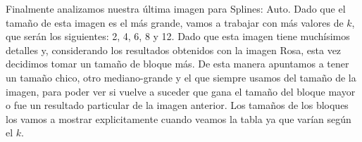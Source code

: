 \documentclass[a4paper]{article}
\begin{document}
Finalmente analizamos nuestra última imagen para Splines: Auto. Dado que el tamaño de esta imagen es el más grande, vamos a trabajar con más valores de $k$, que serán los siguientes: 2, 4, 6, 8 y 12. Dado que esta imagen tiene muchísimos detalles y, considerando los resultados obtenidos con la imagen Rosa, esta vez decidimos tomar un tamaño de bloque más. De esta manera apuntamos a tener un tamaño chico, otro mediano-grande y el que siempre usamos del tamaño de la imagen, para poder ver si vuelve a suceder que gana el tamaño del bloque mayor o fue un resultado particular de la imagen anterior.	 Los tamaños de los bloques los vamos a mostrar explicitamente cuando veamos la tabla ya que varían según el $k$.

\begin{figure}[H]
\centering
{}

\end{figure}
\end{document}
